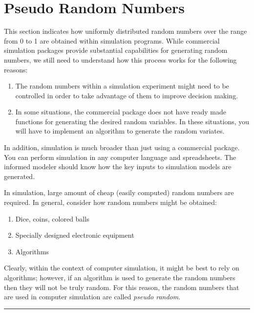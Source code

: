 \documentclass[
]{book}
\theoremstyle{definition}
\theoremstyle{definition}
\theoremstyle{definition}
\theoremstyle{definition}
\theoremstyle{remark}
\begin{document}
\hypertarget{app:rnrv:rn}{%
\section{Pseudo Random Numbers}\label{app:rnrv:rn}}

This section indicates how uniformly distributed random numbers over
the range from 0 to 1 are obtained within simulation programs. While
commercial simulation packages provide substantial capabilities for
generating random numbers, we still need to understand how this process
works for the following reasons:

\begin{enumerate}
\def\labelenumi{\arabic{enumi}.}
\item
  The random numbers within a simulation experiment might need to be
  controlled in order to take advantage of them to improve decision
  making.
\item
  In some situations, the commercial package does not have ready made
  functions for generating the desired random variables. In these
  situations, you will have to implement an algorithm to generate the random variates.
\end{enumerate}

In addition, simulation is much broader than just using a commercial
package. You can perform simulation in any computer language and spreadsheets. The
informed modeler should know how the key inputs to simulation models are
generated.

In simulation, large amount of cheap (easily computed) random numbers
are required. In general, consider how random numbers might be obtained:

\begin{enumerate}
\def\labelenumi{\arabic{enumi}.}
\item
  Dice, coins, colored balls
\item
  Specially designed electronic equipment
\item
  Algorithms
\end{enumerate}

Clearly, within the context of computer simulation, it might be best to
rely on algorithms; however, if an algorithm is used to generate the
random numbers then they will not be truly random. For this reason, the
random numbers that are used in computer simulation are called \emph{pseudo
random}.

\begin{center}\rule{0.5\linewidth}{0.5pt}\end{center}
\end{document}
